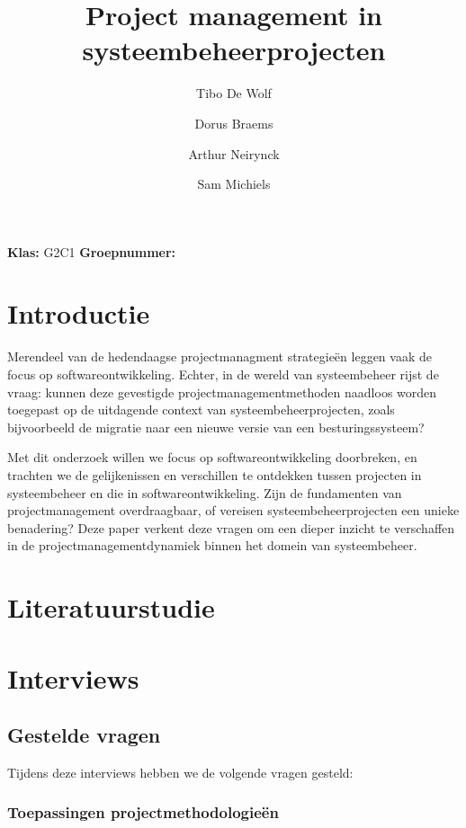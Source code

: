 \documentclass[dutch]{hogent-article}
\title{Project management in systeembeheerprojecten}
\author{Tibo De Wolf}
\author{Dorus Braems}
\author{Arthur Neirynck}
\author{Sam Michiels}
\begin{document}
\begin{abstract}

\end{abstract}
\bigskip
\textbf{Klas:} G2C1
\newline
\textbf{Groepnummer:} 


\newpage

\tableofcontents
\pagebreak

\section{Introductie}%
\label{sec:introductie}

Merendeel van de hedendaagse projectmanagment strategie\"en leggen vaak de focus op softwareontwikkeling. Echter, in de wereld van systeembeheer rijst de vraag: kunnen deze gevestigde projectmanagementmethoden naadloos worden toegepast op de uitdagende context van systeembeheerprojecten, zoals bijvoorbeeld de migratie naar een nieuwe versie van een besturingssysteem?
\newline

Met dit onderzoek willen we focus op softwareontwikkeling doorbreken, en trachten we de gelijkenissen en verschillen te ontdekken tussen projecten in systeembeheer en die in softwareontwikkeling. Zijn de fundamenten van projectmanagement overdraagbaar, of vereisen systeembeheerprojecten een unieke benadering? Deze paper verkent deze vragen om een dieper inzicht te verschaffen in de projectmanagementdynamiek binnen het domein van systeembeheer.


\section{Literatuurstudie}%
\label{sec:literatuurstudie}


\section{Interviews}
\label{sec:interviews}


\subsection{Gestelde vragen}%
\label{ssec:gestelde-vragen}

Tijdens deze interviews hebben we de volgende vragen gesteld:

\subsubsection{Toepassingen projectmethodologieën}
\label{ssec:toepassingen-projectmethodologieën}
\end{document}
